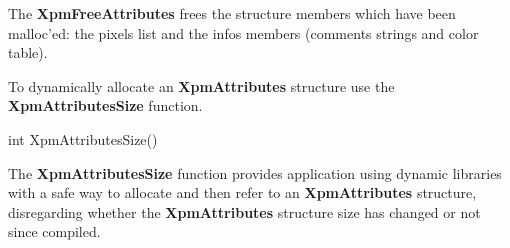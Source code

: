 The {\bf XpmFreeAttributes} frees the structure members which have been
malloc'ed: the pixels list and the infos members (comments strings and color
table).

\vspace{.5cm}
To dynamically allocate an {\bf XpmAttributes} structure use the {\bf
Xpm\-Attributes\-Size} function.

\begin{flushleft} 

int XpmAttributesSize()

\end{flushleft}

The {\bf XpmAttributesSize} function provides application using dynamic
libraries with a safe way to allocate and then refer to an {\bf XpmAttributes}
structure, disregarding whether the {\bf XpmAttributes} structure size has
changed or not since compiled.

 
